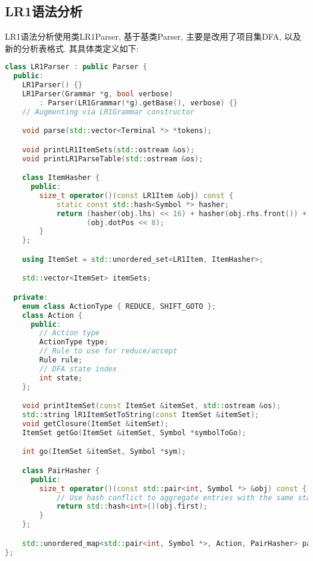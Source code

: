 \subsection{LR1语法分析}
LR1语法分析使用类LR1Parser, 基于基类Parser, 主要是改用了项目集DFA,
以及新的分析表格式. 其具体类定义如下:
\begin{lstlisting}[language=c++]
class LR1Parser : public Parser {
  public:
    LR1Parser() {}
    LR1Parser(Grammar *g, bool verbose)
        : Parser(LR1Grammar(*g).getBase(), verbose) {}
    // Augmenting via LR1Grammar constructor

    void parse(std::vector<Terminal *> *tokens);

    void printLR1ItemSets(std::ostream &os);
    void printLR1ParseTable(std::ostream &os);

    class ItemHasher {
      public:
        size_t operator()(const LR1Item &obj) const {
            static const std::hash<Symbol *> hasher;
            return (hasher(obj.lhs) << 16) + hasher(obj.rhs.front()) +
                   (obj.dotPos << 8);
        }
    };

    using ItemSet = std::unordered_set<LR1Item, ItemHasher>;

    std::vector<ItemSet> itemSets;

  private:
    enum class ActionType { REDUCE, SHIFT_GOTO };
    class Action {
      public:
        // Action type
        ActionType type;
        // Rule to use for reduce/accept
        Rule rule;
        // DFA state index
        int state;
    };

    void printItemSet(const ItemSet &itemSet, std::ostream &os);
    std::string lR1ItemSetToString(const ItemSet &itemSet);
    void getClosure(ItemSet &itemSet);
    ItemSet getGo(ItemSet &itemSet, Symbol *symbolToGo);

    int go(ItemSet &itemSet, Symbol *sym);

    class PairHasher {
      public:
        size_t operator()(const std::pair<int, Symbol *> &obj) const {
            // Use hash conflict to aggregate entries with the same state
            return std::hash<int>()(obj.first);
        }
    };

    std::unordered_map<std::pair<int, Symbol *>, Action, PairHasher> parseTable;
};
\end{lstlisting}

